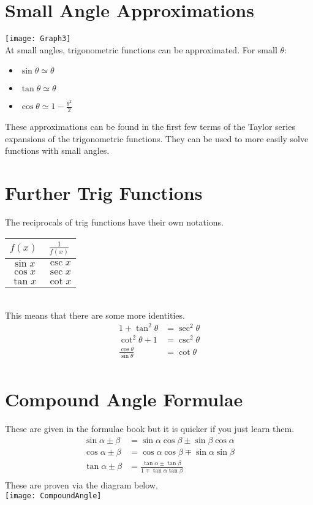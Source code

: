 \documentclass[class=article, crop=false]{standalone}
\begin{document}
\section*{Small Angle Approximations}
\texttt{[image: Graph3]} \\
At small angles, trigonometric functions can be approximated. For small $\theta$:
\begin{itemize}
	\item $\sin \theta \simeq \theta$
	\item $\tan \theta \simeq \theta$
	\item $\cos \theta \simeq 1 - \frac{\theta^2}{2}$
\end{itemize}
These approximations can be found in the first few terms of the Taylor series expansions of the trigonometric functions. They can be used to more easily solve functions with small angles. 
\section*{Further Trig Functions}
The reciprocals of trig functions have their own notations. \\
\begin{tabular}{ c c }
\hline
	 $f(x)$ & $\frac{1}{f(x)}$  \\ 
\hline
	$\sin x$ & $\csc x$ \\
	$\cos x$ & $\sec x$ \\
	$\tan x$ & $\cot x$ \\
\hline
\end{tabular}
\\
This means that there are some more identities. 
\begin{align*}
1 + \tan^2 \theta & = \sec^2 \theta \\
\cot^2 \theta + 1 & = \csc^2 \theta \\
\frac{\cos \theta}{\sin \theta} & = \cot \theta \\
\end{align*}
\section*{Compound Angle Formulae}
These are given in the formulae book but it is quicker if you just learn them. 
\begin{align*}
\sin \alpha \pm \beta & = \sin \alpha \cos \beta \pm \sin \beta \cos \alpha \\
\cos \alpha \pm \beta & = \cos \alpha \cos \beta \mp \sin \alpha \sin \beta \\
\tan \alpha \pm \beta & = \frac{\tan \alpha \pm \tan \beta}{1 \mp \tan \alpha \tan \beta} \\
\end{align*}
These are proven via the diagram below. \\
\texttt{[image: CompoundAngle]} \\
\end{document}
